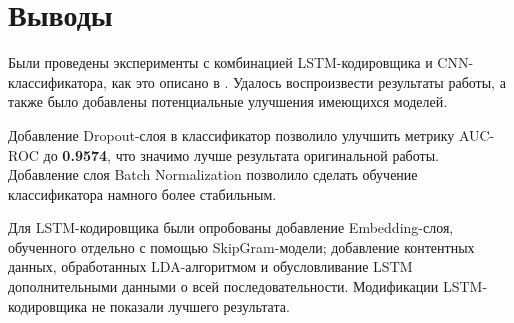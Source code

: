 \section{Выводы}

Были проведены эксперименты с комбинацией LSTM-кодировщика и CNN-классификатора, как это описано в \cite{yuanInsiderThreatDetection2018b}. Удалось воспроизвести результаты работы, а также было добавлены потенциальные улучшения имеющихся моделей.

Добавление Dropout-слоя в классификатор позволило улучшить метрику AUC-ROC до \textbf{0.9574}, что значимо лучше результата оригинальной работы. Добавление слоя Batch Normalization позволило сделать обучение классификатора намного более стабильным.

Для LSTM-кодировщика были опробованы добавление Embedding-слоя, обученного отдельно с помощью SkipGram-модели; добавление контентных данных, обработанных LDA-алгоритмом и обусловливание LSTM дополнительными данными о всей последовательности. Модификации LSTM-кодировщика не показали лучшего результата.